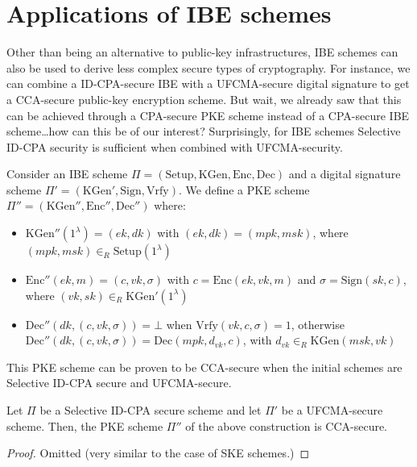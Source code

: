 \documentclass[a4paper, 12pt]{report}
\begin{document}
    \section{Applications of IBE schemes}

    Other than being an alternative to public-key infrastructures, IBE schemes can also be used to derive less complex secure types of cryptography. For instance, we can combine a ID-CPA-secure IBE with a UFCMA-secure digital signature to get a CCA-secure public-key encryption scheme. But wait, we already saw that this can be achieved through a CPA-secure PKE scheme instead of a CPA-secure IBE scheme\dots how can this be of our interest? Surprisingly, for IBE schemes Selective ID-CPA security is sufficient when combined with UFCMA-security.

    Consider an IBE scheme $\Pi = (\mathrm{Setup}, \mathrm{KGen}, \mathrm{Enc}, \mathrm{Dec})$ and a digital signature scheme $\Pi' = (\mathrm{KGen}', \mathrm{Sign}, \mathrm{Vrfy})$. We define a PKE scheme $\Pi'' = (\mathrm{KGen}'', \mathrm{Enc}'', \mathrm{Dec}'')$ where:
    \begin{itemize}
        \item $\mathrm{KGen}''(1^{\lambda}) = (ek, dk)$ with $(ek,dk) = (mpk, msk)$, where $(mpk, msk) \in_R \mathrm{Setup}(1^{\lambda})$
        \item $\mathrm{Enc}''(ek, m) = (c,vk,\sigma)$ with $c = \mathrm{Enc}(ek, vk, m)$ and $\sigma = \mathrm{Sign}(sk, c)$, where $(vk, sk) \in_R \mathrm{KGen}'(1^{\lambda})$
        \item $\mathrm{Dec}''(dk, (c,vk,\sigma)) = \bot$ when $\mathrm{Vrfy}(vk, c, \sigma) = 1$, otherwise $\mathrm{Dec}''(dk, (c,vk,\sigma)) = \mathrm{Dec}(mpk, d_{vk}, c)$, with $d_{vk} \in_R \mathrm{KGen}(msk, vk)$
    \end{itemize}
    
    This PKE scheme can be proven to be CCA-secure when the initial schemes are Selective ID-CPA secure and UFCMA-secure. 

    \begin{framedthm}{}
        Let $\Pi$ be a Selective ID-CPA secure scheme and let $\Pi'$ be a UFCMA-secure scheme. Then, the PKE scheme $\Pi''$ of the above construction is CCA-secure.
    \end{framedthm}

    \begin{proof}
        Omitted (very similar to the case of SKE schemes.)
    \end{proof}
\end{document}
